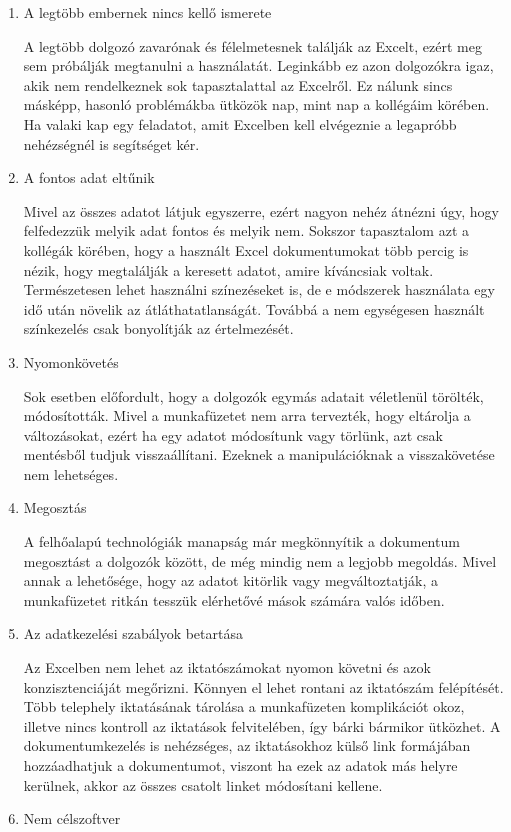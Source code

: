 \documentclass[
]{thesis-ekf}
\theoremstyle{definition}
\theoremstyle{remark}
\begin{document}
\begin{enumerate}[leftmargin=0pt]
	\item A legtöbb embernek nincs kellő ismerete
	
A legtöbb dolgozó zavarónak és félelmetesnek találják az Excelt, ezért meg sem próbálják megtanulni a használatát. Leginkább ez azon dolgozókra igaz, akik nem rendelkeznek sok tapasztalattal az Excelről. Ez nálunk sincs másképp, hasonló problémákba ütközök nap, mint nap a kollégáim körében. Ha valaki kap egy feladatot, amit Excelben kell elvégeznie a legapróbb nehézségnél is segítséget kér.
   \item A fontos adat eltűnik
  
Mivel az összes adatot látjuk egyszerre, ezért nagyon nehéz átnézni úgy, hogy felfedezzük melyik adat fontos és melyik nem.\cite{excel} Sokszor tapasztalom azt a kollégák körében, hogy a használt Excel dokumentumokat több percig is nézik, hogy megtalálják a keresett adatot, amire kíváncsiak voltak. Természetesen lehet használni színezéseket is, de e módszerek használata egy idő után növelik az átláthatatlanságát.\cite{excel} Továbbá a nem egységesen használt színkezelés csak bonyolítják az értelmezését. 
	\item Nyomonkövetés
	
Sok esetben előfordult, hogy a dolgozók egymás adatait véletlenül törölték, módosították. Mivel a munkafüzetet nem arra tervezték, hogy eltárolja a változásokat, ezért ha egy adatot módosítunk vagy törlünk, azt csak mentésből tudjuk visszaállítani. Ezeknek a manipulációknak a visszakövetése nem lehetséges. 
	\item Megosztás
	
A felhőalapú technológiák manapság már megkönnyítik a dokumentum megosztást a dolgozók között, de még mindig nem a legjobb megoldás. Mivel annak a lehetősége, hogy az adatot kitörlik vagy megváltoztatják, a munkafüzetet ritkán tesszük elérhetővé mások számára valós időben. \cite{excel}
	\item Az adatkezelési szabályok betartása 
	
Az Excelben nem lehet az iktatószámokat nyomon követni és azok konzisztenciáját megőrizni. Könnyen el lehet rontani az iktatószám felépítését. Több telephely iktatásának tárolása a munkafüzeten komplikációt okoz, illetve nincs kontroll az iktatások felvitelében, így bárki bármikor ütközhet. A dokumentumkezelés is nehézséges, az iktatásokhoz külső link formájában hozzáadhatjuk a dokumentumot, viszont ha ezek az adatok más helyre kerülnek, akkor az összes csatolt linket módosítani kellene. 
	\item Nem célszoftver
	

\end{enumerate}
\end{document}
